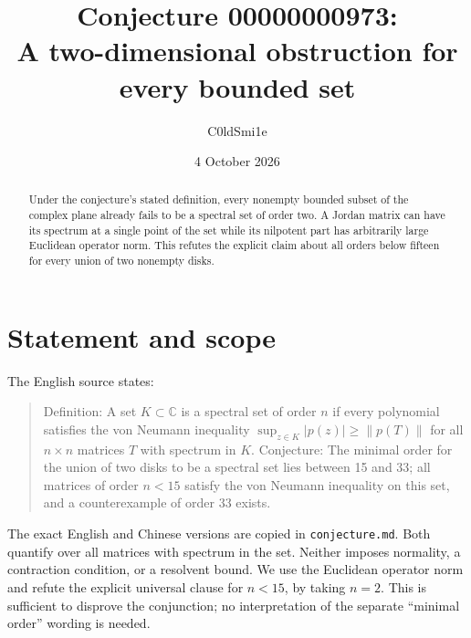 \documentclass[11pt]{article}
\title{Conjecture 00000000973:\\A two-dimensional obstruction for every bounded set}
\author{C0ldSmi1e}
\date{4 October 2026}
\newcommand{\C}{\mathbb C}
\begin{document}
\maketitle
\begin{abstract}
Under the conjecture's stated definition, every nonempty bounded subset of the complex plane already fails to be a spectral set of order two. A Jordan matrix can have its spectrum at a single point of the set while its nilpotent part has arbitrarily large Euclidean operator norm. This refutes the explicit claim about all orders below fifteen for every union of two nonempty disks.
\end{abstract}

\section{Statement and scope}
The English source states:
\begin{quote}
Definition: A set $K\subset\C$ is a spectral set of order $n$ if every polynomial satisfies the von Neumann inequality $\sup_{z\in K}|p(z)|\geq\|p(T)\|$ for all $n\times n$ matrices $T$ with spectrum in $K$. Conjecture: The minimal order for the union of two disks to be a spectral set lies between 15 and 33; all matrices of order $n<15$ satisfy the von Neumann inequality on this set, and a counterexample of order 33 exists.
\end{quote}
The exact English and Chinese versions are copied in \texttt{conjecture.md}. Both quantify over all matrices with spectrum in the set. Neither imposes normality, a contraction condition, or a resolvent bound. We use the Euclidean operator norm and refute the explicit universal clause for $n<15$, by taking $n=2$. This is sufficient to disprove the conjunction; no interpretation of the separate ``minimal order'' wording is needed.

\clearpage
\end{document}
